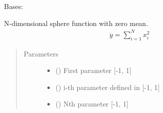 \documentclass[letterpaper,10pt,english,openany,oneside]{sphinxmanual}
\begin{document}

\begin{fulllineitems}
\label{\detokenize{pygpc.testfunctions:pygpc.testfunctions.testfunctions.SphereFun}}
Bases: {\hyperref[\detokenize{pygpc:pygpc.AbstractModel.AbstractModel}]{}}

N-dimensional sphere function with zero mean.
\begin{equation*}
\begin{split}y = \sum_{i=1}^{N}x_i^2\end{split}
\end{equation*}\begin{quote}\begin{description}
\item[{Parameters}] \leavevmode\begin{itemize}
\item {} 
\sphinxstyleliteralstrong{\sphinxupquote{{[}}}\sphinxstyleliteralstrong{\sphinxupquote{{]}}} (\sphinxstyleliteralemphasis{\sphinxupquote{ {[}}}\sphinxstyleliteralemphasis{\sphinxupquote{{]}}}) \textendash{} First parameter {[}-1, 1{]}

\item {} 
\sphinxstyleliteralstrong{\sphinxupquote{{[}}}\sphinxstyleliteralstrong{\sphinxupquote{{]}}} (\sphinxstyleliteralemphasis{\sphinxupquote{ {[}}}\sphinxstyleliteralemphasis{\sphinxupquote{{]}}}) \textendash{} i-th parameter defined in {[}-1, 1{]}

\item {} 
\sphinxstyleliteralstrong{\sphinxupquote{{[}}}\sphinxstyleliteralstrong{\sphinxupquote{{]}}} (\sphinxstyleliteralemphasis{\sphinxupquote{ {[}}}\sphinxstyleliteralemphasis{\sphinxupquote{{]}}}) \textendash{} Nth parameter {[}-1, 1{]}


\end{itemize}
\end{description}
\end{quote}
\end{fulllineitems}
\end{document}
